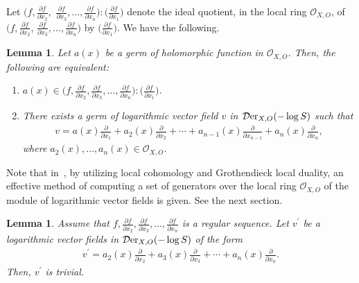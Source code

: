 \documentclass[pdftex]{sigma}%
\numberwithin{equation}{section}
\newtheorem{Lemma}[Theorem]{Lemma}
\begin{document}
Let $\big(f, \frac{\partial f}{\partial x_2},$ $\frac{\partial f}{\partial x_3},\ldots,\frac{\partial f}{\partial x_{n}}\big) : \big(\frac{\partial f}{\partial x_1}\big) $ denote the ideal quotient, in the local ring ${\mathcal O}_{X,O}$, of
$\big(f, \frac{\partial f}{\partial x_2}$, $\frac{\partial f}{\partial x_3},\ldots,
\frac{\partial f}{\partial x_{n}}\big)$ by $\big(\frac{\partial f}{\partial x_1}\big)$. We have the following.


\begin{Lemma}\label{Lem2}
Let $ a(x) $ be a germ of holomorphic function in $ {\mathcal O}_{X,O}$. Then, the following are equivalent:
\begin{enumerate}\itemsep=0pt
\item[$(i)$]
$\displaystyle a(x) \in \bigg(f, \frac{\partial f}{\partial x_2}, \frac{\partial f}{\partial x_3},\ldots,\frac{\partial f}{\partial x_{n}}\bigg) : \bigg(\frac{\partial f}{\partial x_1}\bigg)$.

\item[$(ii)$]
There exists a germ of logarithmic vector field $v$ in ${\mathcal D}{\rm er}_{X, O}(-\log S)$ such that
\begin{gather*}
v= a(x)\frac{\partial }{\partial x_1} + a_2(x)\frac{\partial}{\partial x_2} + \cdots + a_{n-1}(x)\frac{\partial}{\partial x_{n-1}}+ a_n(x)\frac{\partial}{\partial x_n},
\end{gather*}
where $ a_2(x), \ldots , a_{n}(x) \in {\mathcal O}_{X, O}$.
\end{enumerate}
\end{Lemma}

Note that in~\cite{NT18,NT19a}, by utilizing local cohomology and Grothendieck local duality, an effective method of computing a set of generators over the local ring ${\mathcal O}_{X,O}$ of the module of logarithmic vector fields is given. See the next section.

\begin{Lemma}\label{Lem3}
Assume that $f, \frac{\partial f}{\partial x_2}, \frac{\partial f}{\partial x_3}, \ldots, \frac{\partial f}{\partial x_{n}}$ is a regular sequence. Let $v^{\prime}$ be a logarithmic vector fields in ${\mathcal D}{\rm er}_{X, O}(-\log S)$ of the form
\begin{gather*}
v^{\prime}= a_2(x)\frac{\partial }{\partial x_2} + a_3(x)\frac{\partial}{\partial x_3} + \cdots +a_{n}(x)\frac{\partial}{\partial x_{n}}.
\end{gather*}
Then, $v^{\prime}$ is trivial.
\end{Lemma}
\end{document}
